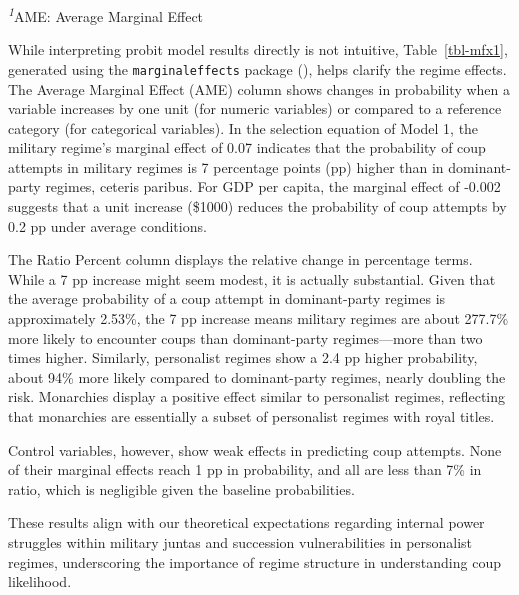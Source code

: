 \documentclass[
  12pt,
]{report}
\begin{document}
\begin{minipage}{\linewidth}
\textsuperscript{\textit{1}}AME: Average Marginal Effect\\
\end{minipage}
\endgroup

While interpreting probit model results directly is not intuitive,
Table~\ref{tbl-mfx1}, generated using the \texttt{marginaleffects}
package (), helps clarify the regime effects. The Average Marginal Effect
(AME) column shows changes in probability when a variable increases by
one unit (for numeric variables) or compared to a reference category
(for categorical variables). In the selection equation of Model 1, the
military regime's marginal effect of 0.07 indicates that the probability
of coup attempts in military regimes is 7 percentage points (pp) higher
than in dominant-party regimes, ceteris paribus. For GDP per capita, the
marginal effect of -0.002 suggests that a unit increase (\$1000) reduces
the probability of coup attempts by 0.2 pp under average conditions.

The Ratio Percent column displays the relative change in percentage
terms. While a 7 pp increase might seem modest, it is actually
substantial. Given that the average probability of a coup attempt in
dominant-party regimes is approximately 2.53\%, the 7 pp increase means
military regimes are about 277.7\% more likely to encounter coups than
dominant-party regimes---more than two times higher. Similarly,
personalist regimes show a 2.4 pp higher probability, about 94\% more
likely compared to dominant-party regimes, nearly doubling the risk.
Monarchies display a positive effect similar to personalist regimes,
reflecting that monarchies are essentially a subset of personalist
regimes with royal titles.

Control variables, however, show weak effects in predicting coup
attempts. None of their marginal effects reach 1 pp in probability, and
all are less than 7\% in ratio, which is negligible given the baseline
probabilities.

These results align with our theoretical expectations regarding internal
power struggles within military juntas and succession vulnerabilities in
personalist regimes, underscoring the importance of regime structure in
understanding coup likelihood.

\begingroup
\setlength{}
\setlength{}\fontsize{12.0pt}{14.4pt}\selectfont
\setlength{\LTpost}{0mm}
\end{document}

